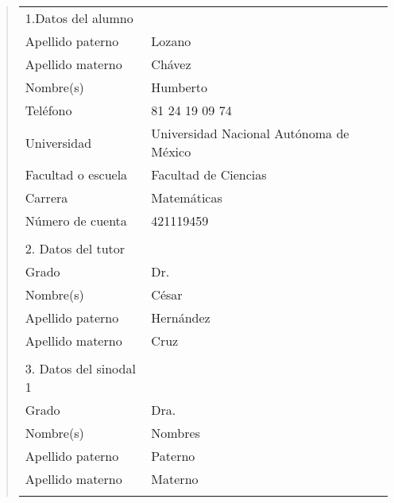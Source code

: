 {\small
\begin{quote}
\begin{tabular}{lll}
1.Datos del alumno          & {}                                          \\
Apellido paterno            & Lozano                                      \\
Apellido materno            & Ch\'avez                                    \\
Nombre(s)                   & Humberto                                    \\
Tel\'efono                  & 81 24 19 09 74                              \\
Universidad                 & Universidad Nacional Aut\'onoma de M\'exico \\
Facultad o escuela          & Facultad de Ciencias                        \\
Carrera                     & Matem\'aticas                               \\
N\'umero de cuenta          & 421119459                                   \\
{}                          & {}                                          \\
2. Datos del tutor          & {}                                          \\
Grado                       & Dr.                                         \\
Nombre(s)                   & C\'esar                                     \\
Apellido paterno            & Hern\'andez                                 \\
Apellido materno            & Cruz                                        \\
{}                          & {}                                          \\
3. Datos del sinodal 1      & {}                                          \\
Grado                       & Dra.                                        \\
Nombre(s)                   & Nombres                                     \\
Apellido paterno            & Paterno                                     \\
Apellido materno            & Materno                                     \\
{}                          & {}                                          \\

\end{tabular}
\end{quote}}
